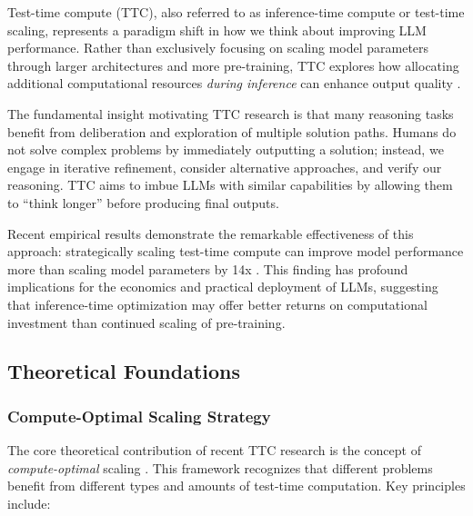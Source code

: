Test-time compute (TTC), also referred to as inference-time compute or test-time scaling, represents a paradigm shift in how we think about improving LLM performance. Rather than exclusively focusing on scaling model parameters through larger architectures and more pre-training, TTC explores how allocating additional computational resources \textit{during inference} can enhance output quality \citep{snell2024scaling,cmu2025metarl}.

The fundamental insight motivating TTC research is that many reasoning tasks benefit from deliberation and exploration of multiple solution paths. Humans do not solve complex problems by immediately outputting a solution; instead, we engage in iterative refinement, consider alternative approaches, and verify our reasoning. TTC aims to imbue LLMs with similar capabilities by allowing them to ``think longer'' before producing final outputs.

Recent empirical results demonstrate the remarkable effectiveness of this approach: strategically scaling test-time compute can improve model performance more than scaling model parameters by 14x \citep{snell2024scaling}. This finding has profound implications for the economics and practical deployment of LLMs, suggesting that inference-time optimization may offer better returns on computational investment than continued scaling of pre-training.

\subsection{Theoretical Foundations}

\subsubsection{Compute-Optimal Scaling Strategy}

The core theoretical contribution of recent TTC research is the concept of \textit{compute-optimal} scaling \citep{snell2024scaling}. This framework recognizes that different problems benefit from different types and amounts of test-time computation. Key principles include:

